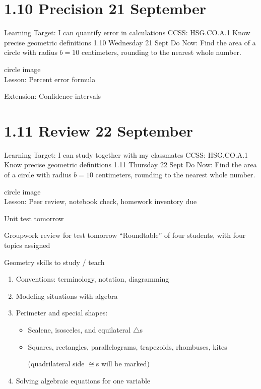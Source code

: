 \section{1.10 Precision \hfill 21 September}
\begin{frame}{Learning Target: I can quantify error in calculations}
    {CCSS: HSG.CO.A.1 Know precise geometric definitions \hfill \alert{1.10 Wednesday 21 Sept}}
        Do Now: Find the area of a circle with radius $b=10$ centimeters, rounding to the nearest whole number. \par
        circle image \\

        Lesson: Percent error formula \par \medskip
        Extension: Confidence intervals
    \end{frame}  

\section{1.11 Review \hfill 22 September}
\begin{frame}{Learning Target: I can study together with my classmates}
    {CCSS: HSG.CO.A.1 Know precise geometric definitions \hfill \alert{1.11 Thursday 22 Sept}}
        Do Now: Find the area of a circle with radius $b=10$ centimeters, rounding to the nearest whole number. \par
        circle image \\

        Lesson: Peer review, notebook check, homework inventory due \par \medskip
        \alert{Unit test tomorrow}
    \end{frame} 

\begin{frame}{Groupwork review for \alert{test tomorrow}}
    {``Roundtable'' of four students, with four topics assigned}
    \begin{block}{Geometry skills to study / teach}
        \begin{enumerate}
        \item Conventions: terminology, notation, diagramming
        \item Modeling situations with algebra
        \item Perimeter and special shapes: 
        \begin{itemize}
        \item Scalene, isosceles, and equilateral $\triangle$s
        \item Squares, rectangles, parallelograms, trapezoids, rhombuses, kites \par 
        (quadrilateral side $\cong$s will be marked)
        \end{itemize}
        \item Solving algebraic equations for one variable
    \end{enumerate}
    \end{block}
    \end{frame}
    
